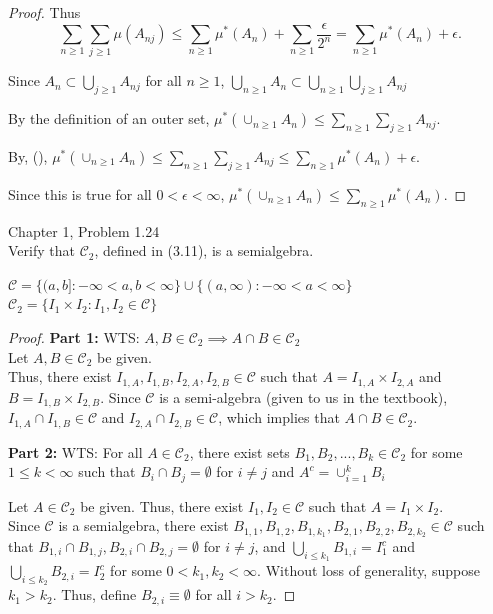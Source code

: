 \documentclass[12pt,letterpaper, onecolumn]{exam}
\newcommand{\calC}{\mathcal{C}}
\newcommand{\om}{\mu^*} %
\begin{document}
\begin{questions}
\begin{solution}
\begin{proof}
        Thus 
        \begin{equation}
            \sum_{n \geq 1} \sum_{j \geq 1}\mu(A_{nj}) \leq \sum_{n \geq 1} \om(A_n) + \sum_{n \geq 1} \frac{\epsilon}{2^n} = \sum_{n \geq 1} \om(A_n) + \epsilon.
        \end{equation}

        Since $A_n \subset \bigcup_{j \geq 1} A_{nj}$ for all $n \geq 1$, $\bigcup_{n\geq 1} A_n \subset \bigcup_{n\geq 1}\bigcup_{j \geq 1} A_{nj}$

        By the definition of an outer set, $\om(\cup_{n \geq 1}A_n) \leq \sum_{n \geq 1}\sum_{j \geq 1} A_{nj}$. 

        By, (\theequation), $\om(\cup_{n \geq 1}A_n) \leq \sum_{n \geq 1}\sum_{j \geq 1} A_{nj} \leq  \sum_{n \geq 1} \om(A_n) + \epsilon$. 

        Since this is true for all $0 < \epsilon < \infty$, $\om(\cup_{n \geq 1}A_n) \leq \sum_{n \geq 1} \om(A_n).$
        \end{proof}
    \end{solution}

    \question Chapter 1, Problem 1.24 \\
    Verify that $\calC_2$, defined in (3.11), is a semialgebra. 
    \begin{solution}
    $\calC= \{(a, b]: -\infty < a, b < \infty\} \cup  \{(a, \infty): -\infty < a < \infty\} $    \\
    $\calC_2 = \{I_1 \times I_2: I_1, I_2 \in \calC\}$

    \begin{proof}
        \textbf{Part 1:} WTS: $A, B \in \calC_2 \implies A \cap B \in \calC_2$ \\
        Let $A, B \in \calC_2$ be given.\\ 
        Thus, there exist $I_{1, A}, I_{1, B}, I_{2, A}, I_{2, B} \in \calC$ such that $A = I_{1, A} \times I_{2, A}$ and $B = I_{1, B} \times I_{2, B}$. Since $\calC$ is a semi-algebra (given to us in the textbook), $I_{1, A} \cap I_{1, B} \in \calC$ and $I_{2, A} \cap I_{2, B} \in \calC$, which implies that $A \cap B \in \calC_2$.

        \textbf{Part 2:} WTS: For all $A \in \calC_2$, there exist sets $B_1, B_2, ..., B_k \in \calC_2$ for some $1 \leq k < \infty$ such that $B_i \cap B_j = \emptyset$ for $i \neq j$ and $A^c = \cup_{i =1}^k B_i$

        Let $A \in \calC_2$ be given. Thus, there exist $I_1, I_2 \in \calC$ such that $A = I_1 \times I_2$. \\
        Since $\calC$ is a semialgebra, there exist $B_{1, 1}, B_{1, 2}, B_{1, k_1}, B_{2, 1}, B_{2, 2}, B_{2, k_2} \in \calC$ such that $B_{1, i} \cap B_{1, j}, B_{2, i} \cap B_{2, j} = \emptyset$ for $i \neq j$, and $\bigcup_{i \leq k_1} B_{1, i} = I_1^c$ and $\bigcup_{i \leq k_2} B_{2, i} = I_2^c$ for some $0 < k_1, k_2 < \infty$. Without loss of generality, suppose $k_1 > k_2$. Thus, define $B_{2, i} \equiv \emptyset$ for all $i > k_2$.


\end{proof}
\end{solution}
\end{questions}
\end{document}
